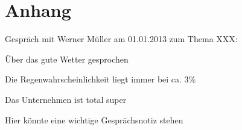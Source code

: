 \section*{Anhang}

\anhangsverzeichnis



Gespräch mit Werner Müller am 01.01.2013 zum Thema XXX:
\begin{compactitem}
   \item Über das gute Wetter gesprochen
   \item Die Regenwahrscheinlichkeit liegt immer bei ca. 3\%
   \item Das Unternehmen ist total super
   \item Hier könnte eine wichtige Gesprächsnotiz stehen
\end{compactitem}

